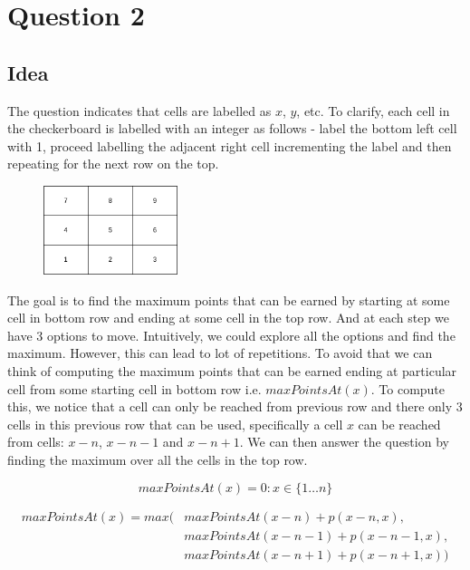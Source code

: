 \documentclass{article}
\begin{document}
    \section*{Question 2}

    \subsection*{Idea}
    The question indicates that cells are labelled as $x$, $y$, etc. To clarify, each cell in the checkerboard is labelled with an integer as follows - label the bottom left cell with 1, proceed labelling the adjacent right cell incrementing the label and then repeating for the next row on the top.

    \begin{figure}[H]
        \begin{center}
            \includegraphics[width=0.35\textwidth]{checkerboard.png}
        \end{center}
    \end{figure}

    The goal is to find the maximum points that can be earned by starting at some cell in bottom row and ending at some cell in the top row. And at each step we have 3 options to move. Intuitively, we could explore all the options and find the maximum. However, this can lead to lot of repetitions. To avoid that we can think of computing the maximum points that can be earned ending at particular cell from some starting cell in bottom row i.e. $maxPointsAt(x)$. To compute this, we notice that a cell can only be reached from previous row and there only 3 cells in this previous row that can be used, specifically a cell $x$ can be reached from cells: $x-n$, $x-n-1$ and $x-n+1$. We can then answer the question by finding the maximum over all the cells in the top row.

    \begin{equation*}
        maxPointsAt(x) = 0 : x \in \{ 1 \dots n \}
    \end{equation*}

    \begin{equation*}
        \begin{split}
            maxPointsAt(x) = 
            max \biggl(
                & maxPointsAt(x-n) + p(x-n, x), \\
                & maxPointsAt(x-n-1) + p(x-n-1, x), \\
                & maxPointsAt(x-n+1) + p(x-n+1, x) \biggr)
        \end{split}
    \end{equation*}
\end{document}
